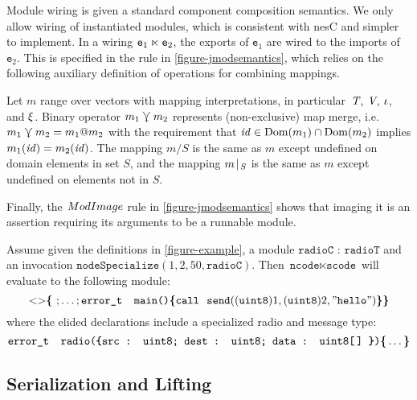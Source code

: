 Module wiring is given a standard component composition semantics. We
only allow wiring of instantiated modules, which is consistent with
nesC and simpler to implement. In a wiring
$\texttt{e}_1 \ltimes \texttt{e}_2$, the exports of $\texttt{e}_1$ are wired to
the imports of $\texttt{e}_2$.  This is specified in the 
rule in \autoref{figure-jmodsemantics}, which relies on the following
auxiliary definition of operations for combining mappings.
\begin{definition}
Let $m$ range over vectors with mapping interpretations, in
particular~$\textit{T}$, $\textit{V}$, $\iota$, and $\xi$. Binary
operator $m_1\curlyveedownarrow m_2$ represents (non-exclusive) map merge,
i.e.~$m_1 \curlyveedownarrow m_2 = m_1 @ m_2$ with the requirement that
$\mathit{id}\in {\rm Dom}(m_1)\cap{\rm Dom}(m_2)$ implies $m_1(\mathit{id}) =
m_2(\mathit{id})$.
The mapping $m / S$ is the same as $m$ except undefined on domain
elements in set $S$, and the mapping $m\!\mid\!_{S}$ is the same
as $m$ except undefined on elements not in ${S}$.
\end{definition}
Finally, the $\TirName{ModImage}$ rule in
\autoref{figure-jmodsemantics} shows that imaging it is an
assertion requiring its arguments to be a runnable module.

\begin{example}
\label{example-scalanesssemantics}
Assume given the definitions in \autoref{figure-example}, a module
$\texttt{radioC : radioT}$ and an invocation 
$\texttt{nodeSpecialize}(1,2,50,\texttt{radioC})$. 
Then $\texttt{ncode} \ltimes \texttt{scode}$ will evaluate to the following module:
$$
\margs{}\lc\ ; \ldots; \texttt{error\_t\ \ main()} \lc \texttt{call}\ \ \texttt{send}((\texttt{uint8})1, (\texttt{uint8})2, "\texttt{hello}") \rc\rc
$$  
where the elided declarations include a specialized radio and message type:
$$
\texttt{error\_t\ \ radio(\textup{\textbf{\{}}\texttt{src : uint8}; \texttt{dest : uint8}; \texttt{data : uint8[\,]} \textup{\textbf{\}}})} \textup{\textbf{\{}} \ldots \textup{\textbf{\}}}
$$
\end{example}

\subsection{Serialization and Lifting}
\label{section-serialization}

